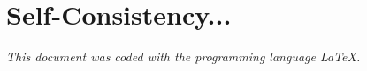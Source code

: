 \chapter{Self-Consistency...} %

\label{Note} %

\emph{This document was coded with the programming language \LaTeX.}